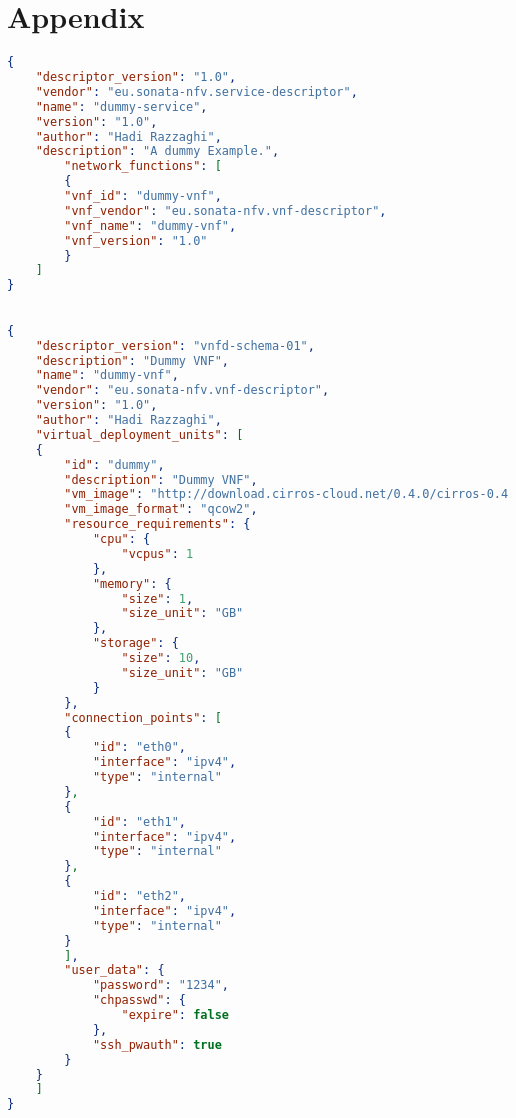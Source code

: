 \appendix


\chapter{Appendix}
\label{ch:Appendix}

\begin{lstlisting}[language=json,caption=NSD]
{
	"descriptor_version": "1.0",
	"vendor": "eu.sonata-nfv.service-descriptor",
	"name": "dummy-service",
	"version": "1.0",
	"author": "Hadi Razzaghi",
	"description": "A dummy Example.",
		"network_functions": [
		{
		"vnf_id": "dummy-vnf",
		"vnf_vendor": "eu.sonata-nfv.vnf-descriptor",
		"vnf_name": "dummy-vnf",
		"vnf_version": "1.0"
		}
	]
}
\end{lstlisting}

\begin{lstlisting}[language=json, caption=VNFD]

{
	"descriptor_version": "vnfd-schema-01",
	"description": "Dummy VNF",
	"name": "dummy-vnf",
	"vendor": "eu.sonata-nfv.vnf-descriptor",
	"version": "1.0",
	"author": "Hadi Razzaghi",
	"virtual_deployment_units": [
	{
		"id": "dummy",
		"description": "Dummy VNF",
		"vm_image": "http://download.cirros-cloud.net/0.4.0/cirros-0.4.0-x86_64-disk.img",
		"vm_image_format": "qcow2",
		"resource_requirements": {
			"cpu": {
				"vcpus": 1
			},
			"memory": {
				"size": 1,
				"size_unit": "GB"
			},
			"storage": {
				"size": 10,
				"size_unit": "GB"
			}
		},
		"connection_points": [
		{
			"id": "eth0",
			"interface": "ipv4",
			"type": "internal"
		},
		{
			"id": "eth1",
			"interface": "ipv4",
			"type": "internal"
		},
		{
			"id": "eth2",
			"interface": "ipv4",
			"type": "internal"
		}
		],
		"user_data": {
			"password": "1234",
			"chpasswd": {
				"expire": false
			},
			"ssh_pwauth": true
		}
	}
	]
}
\end{lstlisting}
